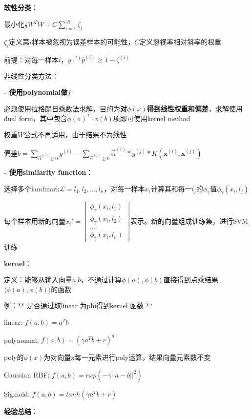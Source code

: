 \documentclass[UTF8]{ctexart}
\begin{document}
  \quad \textbf{软性分类}：

  \quad \quad 最小化$\frac{1}{2}W^TW + C\sum_{i=1}^{|B|}\zeta_i $

  \quad \quad \quad $\zeta_i$定义第$i$样本被忽视为误差样本的可能性，$C$定义忽视率相对斜率的权重

  \quad \quad 前提：对每一样本$i$，$y^{(i)}\hat{p}^{(i)} \geq 1 - \zeta^{(i)}$

  非线性分类方法：

  \textbf{- 使用polynomial做$f$}

  \quad 必须使用拉格朗日乘数法求解，目的为\textbf{对$\phi(x)$得到线性权重和偏差}，求解使用dual form，其中包含$\phi(a)^T \cdot \phi(b)$项即可使用kernel method

  \quad 权重$W$公式不再适用，由于结果不为线性

  \quad 偏差$b = \sum_{\vec{\alpha}^{(i)} \geq 0} y^{(i)} - \sum_{\vec{\alpha}^{(j)} \geq 0} \vec{\alpha}^{(i)} * y^{(j)} * K(\mathbf{x}^{(i)}, \mathbf{x}^{(j)})$

  \textbf{- 使用similarity function}：
  
  \quad 选择多个landmark$\mathcal{L} = l_1, l_2, ..., l_n$，对每一样本$x_i$计算其和每一$l_j$的$\phi_{\gamma}$值$\phi_{\gamma}(x_i, l_j)$

  \quad 每个样本用新的向量$x_i' = \begin{bmatrix}
    \phi_{\gamma}(x_i, l_1) \\
    \phi_{\gamma}(x_i, l_2) \\
    ... \\
    \phi_{\gamma}(x_i, l_n)
  \end{bmatrix}$表示。新的向量组成训练集，进行SVM训练

  \textbf{kernel}：

  \quad 定义：能够从输入向量$a$,$b$，不通过计算$\phi(a), \phi(b)$直接得到点乘结果$\langle \phi (a), \phi (b)\rangle $的函数

  \quad 例：** 是否通过取linear 为phi得到kernel 函数 **

  \quad \quad linear: $f(a, b) = a^Tb$

  \quad \quad polynomial: $f(a, b) = (\gamma a^Tb+r)^d$

  \quad \quad \quad poly的$\phi(x)$为对向量x每一元素进行poly运算，结果向量元素数不变

  \quad \quad Gaussian RBF: $f(a, b) = exp(-\gamma ||a-b||^2)$

  \quad \quad Sigmoid: $f(a, b) = tanh(\gamma a^Tb + r)$

  \quad \textbf{经验总结}：
\end{document}
